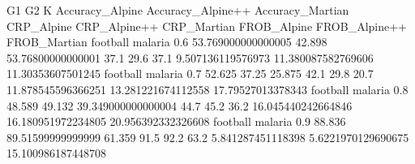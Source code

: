 G1 G2 K Accuracy_Alpine Accuracy_Alpine++ Accuracy_Martian CRP_Alpine CRP_Alpine++ CRP_Martian FROB_Alpine FROB_Alpine++ FROB_Martian
football malaria 0.6 53.769000000000005 42.898 53.76800000000001 37.1 29.6 37.1 9.507136119576973 11.380087582769606 11.30353607501245
football malaria 0.7 52.625 37.25 25.875 42.1 29.8 20.7 11.878545596366251 13.281221674112558 17.79527013378343
football malaria 0.8 48.589 49.132 39.349000000000004 44.7 45.2 36.2 16.045440242664846 16.180951972234805 20.956392332326608
football malaria 0.9 88.836 89.51599999999999 61.359 91.5 92.2 63.2 5.841287451118398 5.6221970129690675 15.100986187448708
